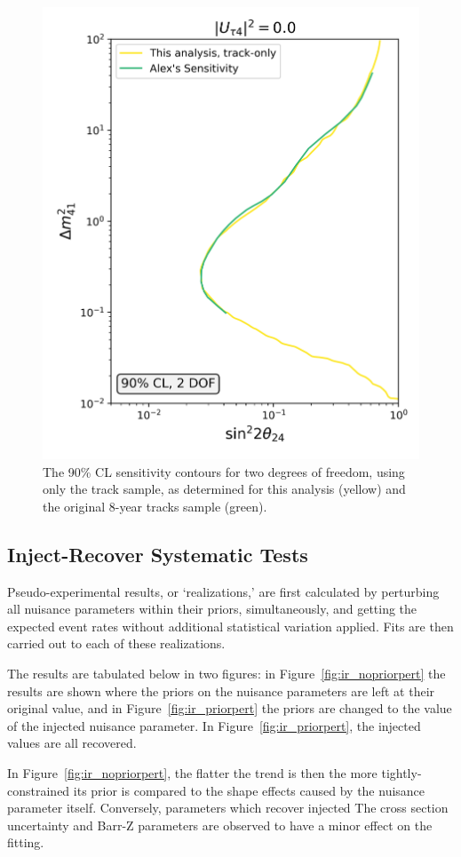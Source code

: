 \documentclass[main.tex]{subfiles}
\begin{document}
\begin{figure}
    \centering
    \includegraphics[width=0.6\linewidth]{figures/track_asimov_oldairs_Realization_Asimov_sterile_0_cl0.9_dof2.png}
    \caption{The 90\% CL sensitivity contours for two degrees of freedom, using only the track sample, as determined for this analysis (yellow) and the original 8-year tracks sample (green).}\label{fig:comparison}
\end{figure}

\subsection{Inject-Recover Systematic Tests}

Pseudo-experimental results, or `realizations,' are first calculated by perturbing all nuisance parameters within their priors, simultaneously, and getting the expected event rates without additional statistical variation applied. 
Fits are then carried out to each of these realizations.

The results are tabulated below in two figures: in Figure~\ref{fig:ir_nopriorpert} the results are shown where the priors on the nuisance parameters are left at their original value, and in Figure~\ref{fig:ir_priorpert} the priors are changed to the value of the injected nuisance parameter. 
In Figure~\ref{fig:ir_priorpert}, the injected values are all recovered. 

In Figure~\ref{fig:ir_nopriorpert}, the flatter the trend is then the more tightly-constrained its prior is compared to the shape effects caused by the nuisance parameter itself. 
Conversely, parameters which recover injected
The cross section uncertainty and Barr-Z parameters are observed to have a minor effect on the fitting. 
\end{document}
